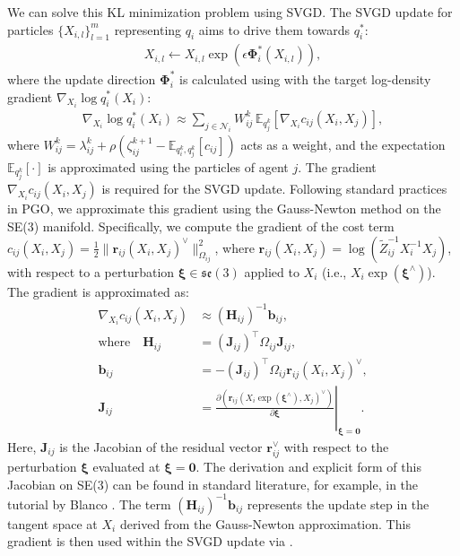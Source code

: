 We can solve this KL minimization problem using SVGD. The SVGD update for particles $\{X_{i,l}\}_{l=1}^m$ representing $q_i$ aims to drive them towards $q_i^*$:
\begin{equation}
\begin{aligned}
X_{i,l} \leftarrow X_{i,l} \exp(\epsilon \boldsymbol{\Phi}_i^*(X_{i,l})),
\label{eq:admm_svgd_update}
\end{aligned}
\end{equation}
where the update direction $\boldsymbol{\Phi}_i^*$ is calculated using  with the target log-density gradient $\nabla_{X_i} \log q_i^*(X_i)$:
\begin{equation}
\begin{aligned}
\nabla_{X_i} \log q_i^*(X_i) \approx \sum_{j \in {\mathcal{N}}_i} W_{ij}^k \, \mathbb{E}_{q_j^k}[\nabla_{X_i} c_{ij}(X_i, X_j)],
\label{eq:admm_target_gradient}
\end{aligned}
\end{equation}
where $W_{ij}^k = \lambda_{ij}^k + \rho(\zeta_{ij}^{k+1} - \mathbb{E}_{q_i^k, q_j^k}[c_{ij}])$ acts as a weight, and the expectation $\mathbb{E}_{q_j^k}[\cdot]$ is approximated using the particles of agent $j$. The gradient $\nabla_{X_i} c_{ij}(X_i, X_j)$ is required for the SVGD update. Following standard practices in PGO, we approximate this gradient using the Gauss-Newton method on the SE(3) manifold. Specifically, we compute the gradient of the cost term $c_{ij}(X_i, X_j) = \frac{1}{2} \| {\mathbf{r}}_{ij}(X_i, X_j)^\vee \|^2_{\Omega_{ij}}$, where ${\mathbf{r}}_{ij}(X_i, X_j) = \log({\tilde{Z}}_{ij}^{-1} X_i^{-1} X_j)$, with respect to a perturbation $\boldsymbol{\xi} \in {\mathfrak{se}}(3)$ applied to $X_i$ (i.e., $X_i \exp(\boldsymbol{\xi}^\wedge)$). The gradient is approximated as:
\begin{equation}
\begin{aligned}
\nabla_{X_i} c_{ij}(X_i, X_j) &\approx ({\mathbf{H}}_{ij})^{-1} {\mathbf{b}}_{ij}, \\
\text{where} \quad {\mathbf{H}}_{ij} &= ({\mathbf{J}}_{ij})^\top \Omega_{ij} {\mathbf{J}}_{ij}, \\
{\mathbf{b}}_{ij} &= -({\mathbf{J}}_{ij})^\top \Omega_{ij} {\mathbf{r}}_{ij}(X_i, X_j)^\vee, \\
{\mathbf{J}}_{ij} &= \left. \frac{\partial ({\mathbf{r}}_{ij}(X_i \exp(\boldsymbol{\xi}^\wedge), X_j)^\vee)}{\partial \boldsymbol{\xi}} \right|_{\boldsymbol{\xi}=\mathbf{0}}.
\label{eq:gradient_cij_gauss_newton}
\end{aligned}
\end{equation}
Here, ${\mathbf{J}}_{ij}$ is the Jacobian of the residual vector ${\mathbf{r}}_{ij}^\vee$ with respect to the perturbation $\boldsymbol{\xi}$ evaluated at $\boldsymbol{\xi}=\mathbf{0}$. The derivation and explicit form of this Jacobian on SE(3) can be found in standard literature, for example, in the tutorial by Blanco \cite{Blanco2012ATO}. The term $({\mathbf{H}}_{ij})^{-1} {\mathbf{b}}_{ij}$ represents the update step in the tangent space at $X_i$ derived from the Gauss-Newton approximation. This gradient is then used within the SVGD update  via .

